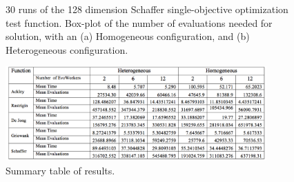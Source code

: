 \documentclass{llncs}
\begin{document}
\begin{figure}[b]
    \centering
 

    \caption{30 runs of the 128 dimension Schaffer single-objective optimization test function. 
    Box-plot of the number of evaluations needed for solution, with an (a) Homogeneous configuration, and (b) Heterogeneous configuration.}
    \label{fig:schaffer}
\end{figure}

\begin{figure}[t]
    \centering
        \includegraphics[width=10cm]{img/table.png}
    \caption{Summary table of results. }
    \label{fig:summary}
\end{figure}



\end{document}
